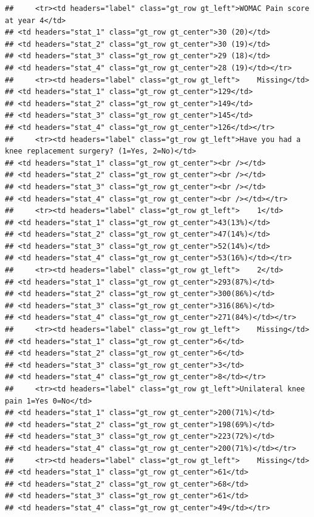 \documentclass{article}
\begin{document}
\begin{verbatim}
##     <tr><td headers="label" class="gt_row gt_left">WOMAC Pain score at year 4</td>
## <td headers="stat_1" class="gt_row gt_center">30 (20)</td>
## <td headers="stat_2" class="gt_row gt_center">30 (19)</td>
## <td headers="stat_3" class="gt_row gt_center">29 (18)</td>
## <td headers="stat_4" class="gt_row gt_center">28 (19)</td></tr>
##     <tr><td headers="label" class="gt_row gt_left">    Missing</td>
## <td headers="stat_1" class="gt_row gt_center">129</td>
## <td headers="stat_2" class="gt_row gt_center">149</td>
## <td headers="stat_3" class="gt_row gt_center">145</td>
## <td headers="stat_4" class="gt_row gt_center">126</td></tr>
##     <tr><td headers="label" class="gt_row gt_left">Have you had a knee replacement surgery? (1=Yes, 2=No)</td>
## <td headers="stat_1" class="gt_row gt_center"><br /></td>
## <td headers="stat_2" class="gt_row gt_center"><br /></td>
## <td headers="stat_3" class="gt_row gt_center"><br /></td>
## <td headers="stat_4" class="gt_row gt_center"><br /></td></tr>
##     <tr><td headers="label" class="gt_row gt_left">    1</td>
## <td headers="stat_1" class="gt_row gt_center">43(13%)</td>
## <td headers="stat_2" class="gt_row gt_center">47(14%)</td>
## <td headers="stat_3" class="gt_row gt_center">52(14%)</td>
## <td headers="stat_4" class="gt_row gt_center">53(16%)</td></tr>
##     <tr><td headers="label" class="gt_row gt_left">    2</td>
## <td headers="stat_1" class="gt_row gt_center">293(87%)</td>
## <td headers="stat_2" class="gt_row gt_center">300(86%)</td>
## <td headers="stat_3" class="gt_row gt_center">316(86%)</td>
## <td headers="stat_4" class="gt_row gt_center">271(84%)</td></tr>
##     <tr><td headers="label" class="gt_row gt_left">    Missing</td>
## <td headers="stat_1" class="gt_row gt_center">6</td>
## <td headers="stat_2" class="gt_row gt_center">6</td>
## <td headers="stat_3" class="gt_row gt_center">3</td>
## <td headers="stat_4" class="gt_row gt_center">8</td></tr>
##     <tr><td headers="label" class="gt_row gt_left">Unilateral knee pain 1=Yes 0=No</td>
## <td headers="stat_1" class="gt_row gt_center">200(71%)</td>
## <td headers="stat_2" class="gt_row gt_center">198(69%)</td>
## <td headers="stat_3" class="gt_row gt_center">223(72%)</td>
## <td headers="stat_4" class="gt_row gt_center">200(71%)</td></tr>
##     <tr><td headers="label" class="gt_row gt_left">    Missing</td>
## <td headers="stat_1" class="gt_row gt_center">61</td>
## <td headers="stat_2" class="gt_row gt_center">68</td>
## <td headers="stat_3" class="gt_row gt_center">61</td>
## <td headers="stat_4" class="gt_row gt_center">49</td></tr>

\end{verbatim}
\end{document}
